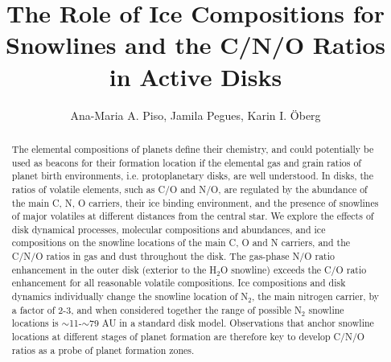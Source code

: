 \documentclass[apj]{emulateapj}
\begin{document}


\title{The Role of Ice Compositions for Snowlines and the C/N/O Ratios in Active Disks}

\author{Ana-Maria A. Piso, Jamila Pegues, Karin I. \"Oberg}


\begin{abstract}
The elemental compositions of planets define their chemistry, and could potentially be used as beacons for their formation location if the elemental gas and grain ratios of planet birth environments, i.e. protoplanetary disks, are well understood. In disks, the ratios of volatile elements, such as C/O and N/O, are regulated by the abundance of the main C, N, O carriers, their ice binding environment, and the presence of snowlines of major volatiles at different distances from the central star. We explore the effects of disk dynamical processes, molecular compositions and abundances, and ice compositions on the snowline locations of the main C, O and N carriers, and the C/N/O ratios in gas and dust throughout the disk. The gas-phase N/O ratio enhancement in the outer disk (exterior to the H$_2$O snowline) exceeds the C/O ratio enhancement for all reasonable volatile compositions. Ice compositions and disk dynamics individually change the snowline location of N$_2$, the main nitrogen carrier, by a factor of 2-3, and when considered together the range of possible N$_2$ snowline locations is $\sim$11-$\sim$79 AU in a standard disk model. Observations that anchor snowline locations at different stages of planet formation are therefore key to develop C/N/O ratios as a probe of planet formation zones. 


\end{abstract}
\end{document}
